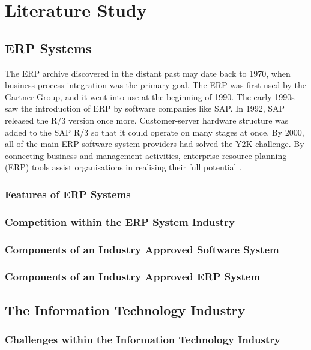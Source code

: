 \chapter{Literature Study}
\section{ERP Systems}
\par{The ERP archive discovered in the distant past may date back to 1970, when business process integration was the primary goal. The ERP was first used by the Gartner Group, and it went into use at the beginning of 1990. The early 1990s saw the introduction of ERP by software companies like SAP. In 1992, SAP released the R/3 version once more. Customer-server hardware structure was added to the SAP R/3 so that it could operate on many stages at once. By 2000, all of the main ERP software system providers had solved the Y2K challenge. By connecting business and management activities, enterprise resource planning (ERP) tools assist organisations in realising their full potential \citep{uccakturk2013effects}.}

\subsection{Features of ERP Systems}
\subsection{Competition within the ERP System Industry}
\subsection{Components of an Industry Approved Software System}
\subsection{Components of an Industry Approved ERP System}
\section{The Information Technology Industry}
\subsection{Challenges within the Information Technology Industry}

